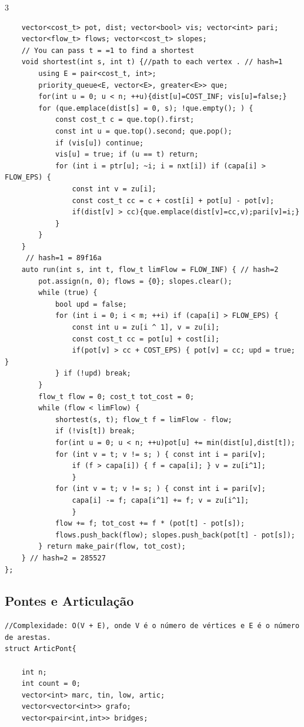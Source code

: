 \documentclass[9pt, a4paper, notitlepage]{extreport}
\begin{document}
\begin{multicols}{3}
\begin{verbatim}
    vector<cost_t> pot, dist; vector<bool> vis; vector<int> pari;
    vector<flow_t> flows; vector<cost_t> slopes;
    // You can pass t = =1 to find a shortest
    void shortest(int s, int t) {//path to each vertex . // hash=1
        using E = pair<cost_t, int>;
        priority_queue<E, vector<E>, greater<E>> que;
        for(int u = 0; u < n; ++u){dist[u]=COST_INF; vis[u]=false;}
        for (que.emplace(dist[s] = 0, s); !que.empty(); ) {
            const cost_t c = que.top().first;
            const int u = que.top().second; que.pop();
            if (vis[u]) continue;
            vis[u] = true; if (u == t) return;
            for (int i = ptr[u]; ~i; i = nxt[i]) if (capa[i] > FLOW_EPS) {
                const int v = zu[i];
                const cost_t cc = c + cost[i] + pot[u] - pot[v];
                if(dist[v] > cc){que.emplace(dist[v]=cc,v);pari[v]=i;}
            }
        }
    }
     // hash=1 = 89f16a
    auto run(int s, int t, flow_t limFlow = FLOW_INF) { // hash=2
        pot.assign(n, 0); flows = {0}; slopes.clear();
        while (true) {
            bool upd = false;
            for (int i = 0; i < m; ++i) if (capa[i] > FLOW_EPS) {
                const int u = zu[i ^ 1], v = zu[i];
                const cost_t cc = pot[u] + cost[i];
                if(pot[v] > cc + COST_EPS) { pot[v] = cc; upd = true; }
            } if (!upd) break;
        }
        flow_t flow = 0; cost_t tot_cost = 0;
        while (flow < limFlow) {
            shortest(s, t); flow_t f = limFlow - flow;
            if (!vis[t]) break;
            for(int u = 0; u < n; ++u)pot[u] += min(dist[u],dist[t]);
            for (int v = t; v != s; ) { const int i = pari[v];
                if (f > capa[i]) { f = capa[i]; } v = zu[i^1];
                }
            for (int v = t; v != s; ) { const int i = pari[v];
                capa[i] -= f; capa[i^1] += f; v = zu[i^1];
                }
            flow += f; tot_cost += f * (pot[t] - pot[s]);
            flows.push_back(flow); slopes.push_back(pot[t] - pot[s]);
        } return make_pair(flow, tot_cost);
    } // hash=2 = 285527
};
\end{verbatim}

\subsection{Pontes e Articulação}
\begin{verbatim}
//Complexidade: O(V + E), onde V é o número de vértices e E é o número de arestas.
struct ArticPont{

    int n;
    int count = 0;
    vector<int> marc, tin, low, artic;
    vector<vector<int>> grafo;
    vector<pair<int,int>> bridges;


\end{verbatim}
\end{multicols}
\end{document}
